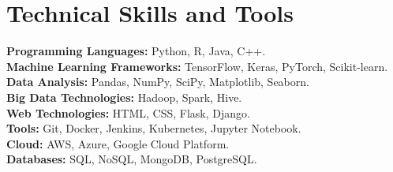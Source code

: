 \vspace{-0.65cm}
\section{Technical Skills and Tools}
\begin{itemize}[leftmargin=0pt, label={}]
    \vspace{-0.25cm}
    \small{\item{
        \textbf{Programming Languages:}{ Python, R, Java, C++.} \\
        \textbf{Machine Learning Frameworks:}{ TensorFlow, Keras, PyTorch, Scikit-learn.} \\
        \textbf{Data Analysis:}{ Pandas, NumPy, SciPy, Matplotlib, Seaborn.} \\
        \textbf{Big Data Technologies:}{ Hadoop, Spark, Hive.} \\
        \textbf{Web Technologies:}{ HTML, CSS, Flask, Django.} \\
        \textbf{Tools:}{ Git, Docker, Jenkins, Kubernetes, Jupyter Notebook.} \\
        \textbf{Cloud:}{ AWS, Azure, Google Cloud Platform.} \\
        \textbf{Databases:}{ SQL, NoSQL, MongoDB, PostgreSQL.}
    }}
\end{itemize}
